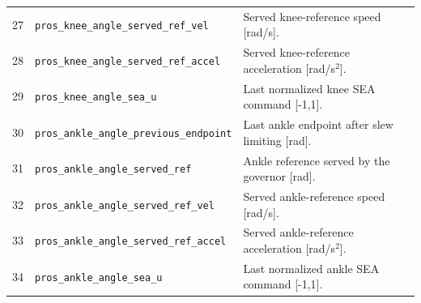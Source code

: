 {\begin{longtable}{@{}r p{7.2cm} p{7.5cm}@{}}
27 & {\fontsize{7.6}{9.2}\selectfont\texttt{pros\_\allowbreak{}knee\_\allowbreak{}angle\_\allowbreak{}served\_\allowbreak{}ref\_\allowbreak{}vel}} & Served knee-reference speed [rad/s].\\
28 & {\fontsize{7.6}{9.2}\selectfont\texttt{pros\_\allowbreak{}knee\_\allowbreak{}angle\_\allowbreak{}served\_\allowbreak{}ref\_\allowbreak{}accel}} & Served knee-reference acceleration [rad/s$^2$].\\
29 & {\fontsize{7.6}{9.2}\selectfont\texttt{pros\_\allowbreak{}knee\_\allowbreak{}angle\_\allowbreak{}sea\_\allowbreak{}u}} & Last normalized knee SEA command [-1,1].\\
30 & {\fontsize{7.6}{9.2}\selectfont\texttt{pros\_\allowbreak{}ankle\_\allowbreak{}angle\_\allowbreak{}previous\_\allowbreak{}endpoint}} & Last ankle endpoint after slew limiting [rad].\\
31 & {\fontsize{7.6}{9.2}\selectfont\texttt{pros\_\allowbreak{}ankle\_\allowbreak{}angle\_\allowbreak{}served\_\allowbreak{}ref}} & Ankle reference served by the governor [rad].\\
32 & {\fontsize{7.6}{9.2}\selectfont\texttt{pros\_\allowbreak{}ankle\_\allowbreak{}angle\_\allowbreak{}served\_\allowbreak{}ref\_\allowbreak{}vel}} & Served ankle-reference speed [rad/s].\\
33 & {\fontsize{7.6}{9.2}\selectfont\texttt{pros\_\allowbreak{}ankle\_\allowbreak{}angle\_\allowbreak{}served\_\allowbreak{}ref\_\allowbreak{}accel}} & Served ankle-reference acceleration [rad/s$^2$].\\
34 & {\fontsize{7.6}{9.2}\selectfont\texttt{pros\_\allowbreak{}ankle\_\allowbreak{}angle\_\allowbreak{}sea\_\allowbreak{}u}} & Last normalized ankle SEA command [-1,1].\\
\bottomrule\end{longtable}
}
